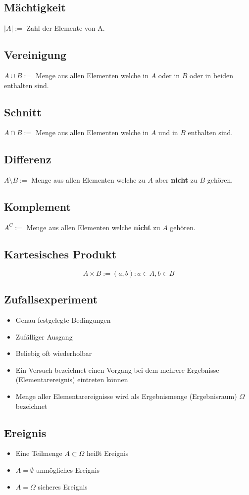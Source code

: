 \documentclass[12pt]{article}
\begin{document}
\subsection{Mächtigkeit}
$|A|:=$ Zahl der Elemente von A.
\subsection{Vereinigung}
$A\cup B:=$ Menge aus allen Elementen welche in $A$ oder in $B$ oder in beiden enthalten sind.
\subsection{Schnitt}
$A\cap B:=$ Menge aus allen Elementen welche in $A$ und in $B$ enthalten sind.
\subsection{Differenz}
$A\setminus B:=$ Menge aus allen Elementen welche zu $A$ aber \textbf{nicht} zu $B$ gehören.
\subsection{Komplement}
$A^C:=$ Menge aus allen Elementen welche \textbf{nicht} zu $A$ gehören.
\subsection{Kartesisches Produkt}
\begin{equation}
	A \times B:={(a, b):a\in A, b\in B}
\end{equation}
\subsection{Zufallsexperiment}
\begin{itemize}
	\item Genau festgelegte Bedingungen
	\item Zufälliger Ausgang
	\item Beliebig oft wiederholbar
	\item Ein Versuch bezeichnet einen Vorgang bei dem mehrere Ergebnisse (Elementarereignis) eintreten können
	\item Menge aller Elementarereignisse wird als Ergebnismenge (Ergebnisraum) $\Omega$ bezeichnet
\end{itemize}
\subsection{Ereignis}
\begin{itemize}
	\item Eine Teilmenge $A \subset \Omega$ heißt Ereignis
	\item $A = \emptyset$ unmögliches Ereignis
	\item $A = \Omega$ sicheres Ereignis
\end{itemize}
\end{document}

